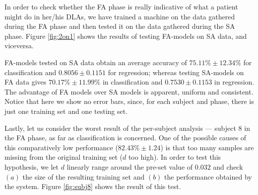 \documentclass[10pt]{bmc_article}
\def\texttt{[image: ]}
\newenvironment{bmcformat}
  {\begin{raggedright}\baselineskip20pt\sloppy\setboolean{publ}{false}}
  {\end{raggedright}\baselineskip20pt\sloppy}
\begin{document}
\begin{bmcformat}
In order to check whether the FA phase is really indicative of what
a patient might do in her/his DLAs, we have trained a
machine on the data gathered during the FA phase and then tested it
on the data gathered during the SA phase. Figure \ref{fig:2on1} shows the
results of testing FA-models on SA data, and viceversa.


FA-models tested on SA data obtain an average accuracy of $75.11\% \pm 12.34\%$
for classification and $0.8056 \pm 0.1151$ for regression;
whereas testing SA-models on FA data gives $70.17\% \pm 11.99\%$ in classification
and $0.7530 \pm 0.1153$ in regression. The advantage of FA models over SA models
is apparent, uniform and consistent. Notice that here we show no error bars,
since, for each subject and phase, there is just one training set and one testing set.

Lastly, let us consider the worst result of the per-subject analysis
--- subject $8$ in the FA phase, as far as classification is concerned.
One of the possible causes of this comparatively low performance
($82.43\% \pm 1.24$) is that too many samples are missing from the
original training set ($d$ too high). In order to test this hypothesis,
we let $d$ linearly range around the pre-set value of $0.032$ and check
$(a)$ the size of the resulting training set and $(b)$ the performance
obtained by the system. Figure \ref{fig:subj8} shows the result of
this test.



\end{bmcformat}
\end{document}
